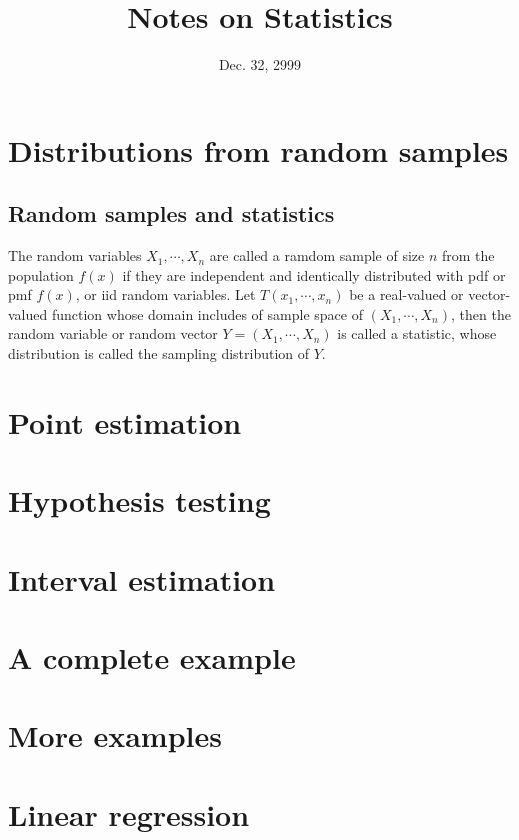 \documentclass[12pt]{article}
\begin{document}
\title{Notes on Statistics}
\date{Dec. 32, 2999}

\maketitle

\section{Distributions from random samples}

  \subsection{Random samples and statistics}

    The random variables $X_1,\cdots,X_n$ are called a ramdom sample of 
    size $n$ from the population $f(x)$ if they are independent and identically
    distributed with pdf or pmf $f(x)$, or iid random
    variables. Let $T(x_1,\cdots,x_n)$ be a real-valued or vector-valued
    function whose domain includes of sample space of $(X_1,\cdots,X_n)$,
    then the random variable or random vector $Y=(X_1,\cdots,X_n)$ is called 
    a statistic, whose distribution is called the sampling distribution of $Y$.


\section{Point estimation}

\section{Hypothesis testing}

\section{Interval estimation}

\section{A complete example}

\section{More examples}

\section{Linear regression}

\begin{thebibliography}{99}
\end{thebibliography}
\end{document}
